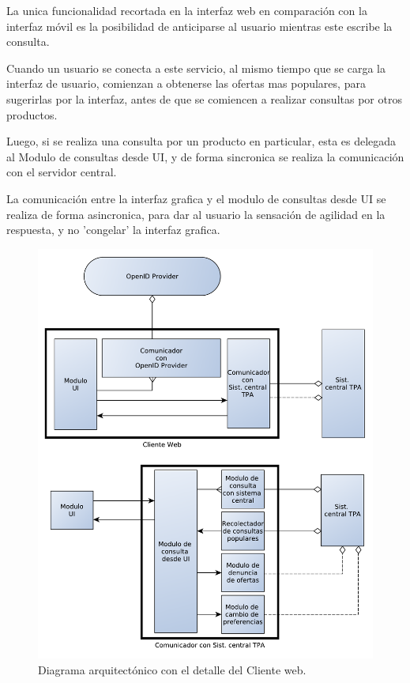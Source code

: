 La unica funcionalidad recortada en la interfaz web en comparación con la interfaz móvil es la posibilidad de anticiparse al usuario mientras este escribe la consulta.

Cuando un usuario se conecta a este servicio, al mismo tiempo que se carga la interfaz de usuario, comienzan a obtenerse las ofertas mas populares, para sugerirlas por la interfaz, antes de que se comiencen a realizar consultas por otros productos.

Luego, si se realiza una consulta por un producto en particular, esta es delegada al \textsf{Modulo de consultas desde UI}, y de forma sincronica se realiza la comunicación con el servidor central.

La comunicación entre la interfaz grafica y el modulo de consultas desde UI se realiza de forma asincronica, para dar al usuario la sensación de agilidad en la respuesta, y no 'congelar' la interfaz grafica.

\begin{figure}[H]
	\centering
	\includegraphics[width=\textwidth]{graficos/arch/Cliente_web.pdf}
	\caption{Diagrama arquitectónico con el detalle del \textsf{Cliente web}.}
\end{figure}


